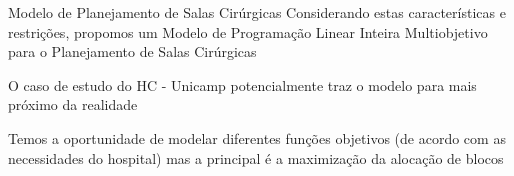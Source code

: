 \documentclass[handout]{beamer}
\newcommand{\ca}[1]{\textcolor{cr}{#1}}
\begin{document}

\begin{frame}{Modelo de Planejamento de Salas Cirúrgicas}
    Considerando estas características e restrições, propomos um \ca{Modelo de Programação Linear Inteira Multiobjetivo para o Planejamento de Salas Cirúrgicas}
    \vspace{2em}

    O caso de estudo do HC - Unicamp potencialmente traz o modelo para mais próximo da realidade
    \vspace{2em}

    Temos a oportunidade de modelar diferentes funções objetivos (de acordo com as necessidades do hospital) mas a principal é a \ca{maximização da alocação de blocos}
\end{frame}
\end{document}
